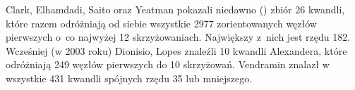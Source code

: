 
Clark, Elhamdadi, Saito oraz Yeatman pokazali niedawno (\cite{clark13}) zbiór 26 kwandli, które razem odróżniają od siebie wszystkie 2977 zorientowanych węzłów pierwszych o~co najwyżej 12 skrzyżowaniach.
Największy z~nich jest rzędu 182.
Wcześniej (w 2003 roku) Dionisio, Lopes znaleźli 10 kwandli Alexandera, które odróżniają 249 węzłów pierwszych do 10 skrzyżowań.
Vendramin znalazł w \cite{vendramin12} wszystkie 431 kwandli spójnych rzędu 35 lub mniejszego.


